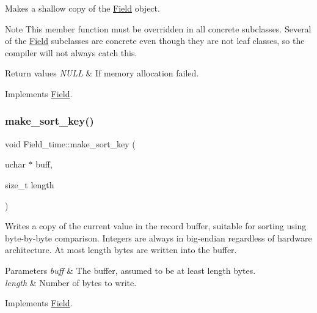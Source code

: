 Makes a shallow copy of the \mbox{\hyperlink{classField}{Field}} object.

\begin{DoxyNote}{Note}
This member function must be overridden in all concrete subclasses. Several of the \mbox{\hyperlink{classField}{Field}} subclasses are concrete even though they are not leaf classes, so the compiler will not always catch this.
\end{DoxyNote}

\begin{DoxyRetVals}{Return values}
{\em N\+U\+LL} & If memory allocation failed. \\
\hline
\end{DoxyRetVals}


Implements \mbox{\hyperlink{classField_a01a9a9aa3a618941e839b1b8793c969d}{Field}}.

\mbox{\label{classField__time_a212ddb3fed8f19fe72d2af7eb968fb06}} 
\subsubsection{\texorpdfstring{make\+\_\+sort\+\_\+key()}{make\_sort\_key()}}
{\footnotesize\ttfamily void Field\+\_\+time\+::make\+\_\+sort\+\_\+key (\begin{DoxyParamCaption}\item[{uchar $\ast$}]{buff,  }\item[{size\+\_\+t}]{length }\end{DoxyParamCaption})\hspace{0.3cm}{\ttfamily [virtual]}}

Writes a copy of the current value in the record buffer, suitable for sorting using byte-\/by-\/byte comparison. Integers are always in big-\/endian regardless of hardware architecture. At most length bytes are written into the buffer.


\begin{DoxyParams}{Parameters}
{\em buff} & The buffer, assumed to be at least length bytes.\\
\hline
{\em length} & Number of bytes to write. \\
\hline
\end{DoxyParams}


Implements \mbox{\hyperlink{classField_af3bc27d237b6ae6ef3dc7a2aec3d79ac}{Field}}.

